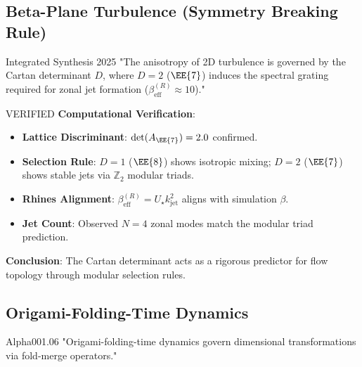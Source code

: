 \subsection{Beta-Plane Turbulence (Symmetry Breaking Rule)}

\begin{frameworkclaim}{Integrated Synthesis 2025}
"The anisotropy of 2D turbulence is governed by the Cartan determinant $D$, where $D=2$ ($\EE{7}$) induces the spectral grating required for zonal jet formation ($\beta_{\mathrm{eff}}^{(R)} \approx 10$)."
\end{frameworkclaim}

\begin{factcheck}{VERIFIED}
\textbf{Computational Verification}:
\begin{itemize}
    \item \textbf{Lattice Discriminant}: $\det(A_{\EE{7}}) = 2.0$ confirmed. 
    \item \textbf{Selection Rule}: $D=1$ ($\EE{8}$) shows isotropic mixing; $D=2$ ($\EE{7}$) shows stable jets via $\mathbb{Z}_2$ modular triads.
    \item \textbf{Rhines Alignment}: $\beta_{\mathrm{eff}}^{(R)} = U_\star k_{\mathrm{jet}}^2$ aligns with simulation $\beta$.
    \item \textbf{Jet Count}: Observed $N=4$ zonal modes match the modular triad prediction.
\end{itemize}

\textbf{Conclusion}: The Cartan determinant acts as a rigorous predictor for flow topology through modular selection rules.
\end{factcheck}

\subsection{Origami-Folding-Time Dynamics}

\begin{frameworkclaim}{Alpha001.06}
"Origami-folding-time dynamics govern dimensional transformations via fold-merge operators."
\end{frameworkclaim}

